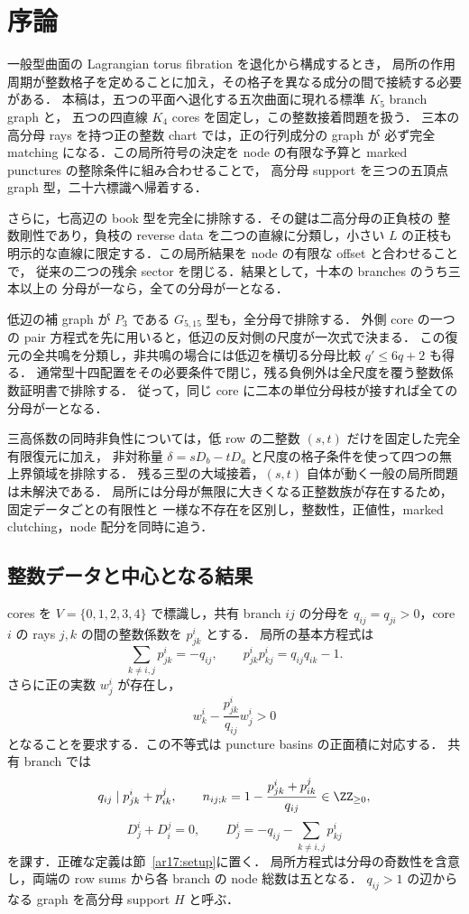 \section{序論}
\label{ar17:introduction}

一般型曲面の Lagrangian torus fibration を退化から構成するとき，
局所の作用周期が整数格子を定めることに加え，その格子を異なる成分の間で接続する必要がある．
本稿は，五つの平面へ退化する五次曲面に現れる標準 $K_5$ branch graph と，
五つの四直線 $K_4$ cores を固定し，この整数接着問題を扱う．
三本の高分母 rays を持つ正の整数 chart では，正の行列成分の graph が
必ず完全 matching になる．この局所符号の決定を node の有限な予算と
marked punctures の整除条件に組み合わせることで，
高分母 support を三つの五頂点 graph 型，二十六標識へ帰着する．

さらに，七高辺の book 型を完全に排除する．その鍵は二高分母の正負枝の
整数剛性であり，負枝の reverse data を二つの直線に分類し，小さい $L$ の正枝も
明示的な直線に限定する．この局所結果を node の有限な offset と合わせることで，
従来の二つの残余 sector を閉じる．結果として，十本の branches のうち三本以上の
分母が一なら，全ての分母が一となる．

低辺の補 graph が $P_3$ である $G_{5,15}$ 型も，全分母で排除する．
外側 core の一つの pair 方程式を先に用いると，低辺の反対側の尺度が一次式で決まる．
この復元の全共鳴を分類し，非共鳴の場合には低辺を横切る分母比較 $q'\le6q+2$ も得る．
通常型十四配置をその必要条件で閉じ，残る負例外は全尺度を覆う整数係数証明書で排除する．
従って，同じ core に二本の単位分母枝が接すれば全ての分母が一となる．

三高係数の同時非負性については，低 row の二整数 $(s,t)$ だけを固定した完全有限復元に加え，
非対称量 $\delta=sD_b-tD_a$ と尺度の格子条件を使って四つの無上界領域を排除する．
残る三型の大域接着，$(s,t)$ 自体が動く一般の局所問題は未解決である．
局所には分母が無限に大きくなる正整数族が存在するため，固定データごとの有限性と
一様な不存在を区別し，整数性，正値性，marked clutching，node 配分を同時に追う．

\subsection{整数データと中心となる結果}

cores を $V=\{0,1,2,3,4\}$ で標識し，共有 branch $ij$ の分母を
$q_{ij}=q_{ji}>0$，core $i$ の rays $j,k$ の間の整数係数を $p^i_{jk}$ とする．
局所の基本方程式は
\[
 \sum_{k\ne i,j}p^i_{jk}=-q_{ij},\qquad
 p^i_{jk}p^i_{kj}=q_{ij}q_{ik}-1.
\]
さらに正の実数 $w^i_j$ が存在し，
\[
 w^i_k-\frac{p^i_{jk}}{q_{ij}}w^i_j>0
\]
となることを要求する．この不等式は puncture basins の正面積に対応する．
共有 branch では
\[
 q_{ij}\mid p^i_{jk}+p^j_{ik},\qquad
 n_{ij;k}=1-\frac{p^i_{jk}+p^j_{ik}}{q_{ij}}\in\ZZ_{\ge0},
\]
\[
 D^i_j+D^j_i=0,\qquad
 D^i_j=-q_{ij}-\sum_{k\ne i,j}p^i_{kj}
\]
を課す．正確な定義は節~\ref{ar17:setup}に置く．
局所方程式は分母の奇数性を含意し，両端の row sums から各 branch の node 総数は五となる．
$q_{ij}>1$ の辺からなる graph を高分母 support $H$ と呼ぶ．

